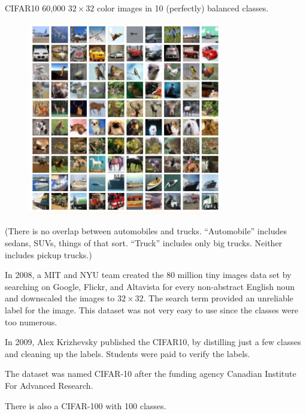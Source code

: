 \begin{frame}[allowframebreaks]

\begin{myconceptblock}{3.21}{CIFAR10}
    60,000 $32 \times 32$ color images in 10 (perfectly) balanced classes.

    \begin{figure}[H]
        \centering
        \includegraphics[width=0.75\textwidth]{.././assets/3.4.jpg}
    \end{figure}

    (There is no overlap between automobiles and trucks. “Automobile” includes sedans, SUVs, things of that sort. “Truck” includes only big trucks. Neither includes pickup trucks.)

    In 2008, a MIT and NYU team created the 80 million tiny images data set by searching on Google, Flickr, and Altavista for every non-abstract English noun and downscaled the images to $32 \times 32$. The search term provided an unreliable label for the image. This dataset was not very easy to use since the classes were too numerous.

    In 2009, Alex Krizhevsky published the CIFAR10, by distilling just a few classes and cleaning up the labels. Students were paid to verify the labels.

    The dataset was named CIFAR-10 after the funding agency Canadian Institute For Advanced Research.

    There is also a CIFAR-100 with 100 classes.
\end{myconceptblock}

\end{frame}


